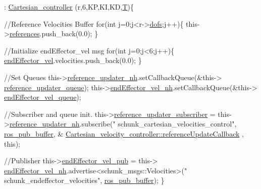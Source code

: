 \begin{DoxyCode}
                                                                               
                                            : \hyperlink{classCartesian__controller_a71055bb1cbf01ced9e64bb1d184b68fe}{Cartesian\_controller}
      (r,6,KP,KI,KD,\hyperlink{classCartesian__controller_a35c6ddbb9624878f2807ff644a33e832}{T})\{

        \textcolor{comment}{//Reference Velocities Buffer}
        \textcolor{keywordflow}{for}(\textcolor{keywordtype}{int} j=0;j<r->\hyperlink{structRobot_a51d4a86ac5314a1ed8614d5664c80747}{dofs};j++)\{
                this->\hyperlink{classCartesian__velocity__controller_afc3792f1f6dd0025417d752a89e519e1}{references}.push\_back(0.0);
        \}

        \textcolor{comment}{//Initialize endEffector\_vel msg}
        \textcolor{keywordflow}{for}(\textcolor{keywordtype}{int} j=0;j<6;j++)\{
                \hyperlink{classCartesian__velocity__controller_ae771d963a90ad7b844c4c3a821ce5f39}{endEffector\_vel}.velocities.push\_back(0.0);
        \}

        \textcolor{comment}{//Set Queues}
        this->\hyperlink{classCartesian__velocity__controller_a7d04d378a2a6d19870a620883dcd3e09}{reference\_updater\_nh}.setCallbackQueue(&this->
      \hyperlink{classCartesian__velocity__controller_ad2804cf83a42305d18572abdbbfd1c3f}{reference\_updater\_queue});
        this->\hyperlink{classCartesian__velocity__controller_a01cbe7f951c69ded8604e552a0a706e0}{endEffector\_vel\_nh}.setCallbackQueue(&this->
      \hyperlink{classCartesian__velocity__controller_af154b0cda931081b52224eb22e4680f7}{endEffector\_vel\_queue});

        \textcolor{comment}{//Subscriber and queue init.}
        this->\hyperlink{classCartesian__velocity__controller_a75412b9859afe4b800f9613c9cb8d17f}{reference\_updater\_subscriber}  = 
      this->\hyperlink{classCartesian__velocity__controller_a7d04d378a2a6d19870a620883dcd3e09}{reference\_updater\_nh}.subscribe(\textcolor{stringliteral}{"
      schunk\_cartesian\_velocities\_control"}, \hyperlink{classCartesian__controller_ab9ed5a808da204dbc612d313dc7332f4}{ros\_pub\_buffer}, &
      \hyperlink{classCartesian__velocity__controller_a2f020f22b2e63da5afeff3f083e4095c}{Cartesian\_velocity\_controller::referenceUpdateCallback}
      , \textcolor{keyword}{this});

        \textcolor{comment}{//Publisher}
        this->\hyperlink{classCartesian__velocity__controller_ab12287816ae785d3cd6243b3df0cffc6}{endEffector\_vel\_pub}   = this->
      \hyperlink{classCartesian__velocity__controller_a01cbe7f951c69ded8604e552a0a706e0}{endEffector\_vel\_nh}.advertise<schunk\_msgs::Velocities>(\textcolor{stringliteral}{"
      schunk\_endeffector\_velocities"}, \hyperlink{classCartesian__controller_ab9ed5a808da204dbc612d313dc7332f4}{ros\_pub\_buffer});
\}
\end{DoxyCode}
